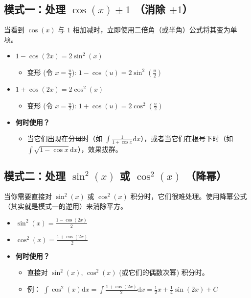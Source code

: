 \documentclass[lang=cn,math=mtpro2,11pt,scheme=chinese]{elegantbook}
\begin{document}
\subsection{模式一：处理 $\cos(x) \pm 1$ （消除 $\pm 1$）}

当看到 $\cos(x)$ 与 $1$ 相加减时，立即使用二倍角（或半角）公式将其变为单项。

\begin{itemize}
  \item $1 - \cos(2x) = 2\sin^2(x)$
  \begin{itemize}
    \item 变形 (令 $x = \frac{u}{2}$): $1 - \cos(u) = 2\sin^2\left(\frac{u}{2}\right)$
  \end{itemize}
  \item $1 + \cos(2x) = 2\cos^2(x)$
  \begin{itemize}
    \item 变形 (令 $x = \frac{u}{2}$): $1 + \cos(u) = 2\cos^2\left(\frac{u}{2}\right)$
  \end{itemize}
  \item \textbf{何时使用？}
  \begin{itemize}
    \item 当它们出现在分母时（如 $\int \frac{1}{1+\cos x} \mathrm{d}x$），或者当它们在根号下时（如 $\int \sqrt{1-\cos x} \mathrm{d}x$），效果拔群。
  \end{itemize}
\end{itemize}
\vspace{3em}

\subsection{模式二：处理 $\sin^2(x)$ 或 $\cos^2(x)$ （降幂）}

当你需要直接对 $\sin^2(x)$ 或 $\cos^2(x)$ 积分时，它们很难处理。使用降幂公式（其实就是模式一的逆用）来消除平方。

\begin{itemize}
  \item $\sin^2(x) = \frac{1 - \cos(2x)}{2}$
  \item $\cos^2(x) = \frac{1 + \cos(2x)}{2}$
  \item \textbf{何时使用？}
  \begin{itemize}
    \item 直接对 $\sin^2(x)$, $\cos^2(x)$ (或它们的偶数次幂) 积分时。
    \item 例： $\int \cos^2(x) \mathrm{d}x = \int \frac{1 + \cos(2x)}{2} \mathrm{d}x = \frac{1}{2}x + \frac{1}{4}\sin(2x) + C$
  \end{itemize}
\end{itemize}
\vspace{3em}
\end{document}
